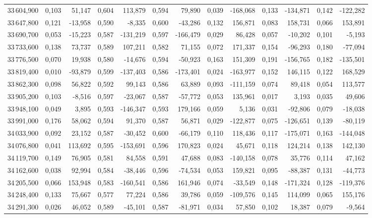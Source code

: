 \begin{longtable}{rrrrrrrrrrrrr}
33\,604,900 & 0,103 & 51,147 & 0,604 & 113,879 & 0,594 & 79,890 & 0,039 & -168,068 & 0,133 & -134,871 & 0,142 & -122,282\\
33\,647,800 & 0,121 & -13,958 & 0,590 & -8,335 & 0,600 & -43,286 & 0,132 & 156,871 & 0,083 & 158,731 & 0,066 & 153,891\\
33\,690,700 & 0,053 & -15,223 & 0,587 & -131,219 & 0,597 & -166,479 & 0,029 & 86,428 & 0,057 & -10,202 & 0,101 & -5,193\\
33\,733,600 & 0,138 & 73,737 & 0,589 & 107,211 & 0,582 & 71,155 & 0,072 & 171,337 & 0,154 & -96,293 & 0,180 & -77,094\\
33\,776,500 & 0,070 & 19,938 & 0,580 & -14,676 & 0,594 & -50,923 & 0,163 & 151,309 & 0,191 & -156,765 & 0,182 & -135,501\\
33\,819,400 & 0,010 & -93,879 & 0,599 & -137,403 & 0,586 & -173,401 & 0,024 & -163,977 & 0,152 & 146,115 & 0,122 & 168,529\\
33\,862,300 & 0,098 & 56,822 & 0,592 & 99,143 & 0,586 & 63,889 & 0,093 & -111,159 & 0,074 & 89,418 & 0,054 & 113,577\\
33\,905,200 & 0,103 & -8,516 & 0,597 & -23,067 & 0,587 & -57,772 & 0,053 & 135,961 & 0,017 & 3,193 & 0,035 & 49,606\\
33\,948,100 & 0,049 & 3,895 & 0,593 & -146,347 & 0,593 & 179,166 & 0,059 & 5,136 & 0,031 & -92,806 & 0,079 & -18,038\\
33\,991,000 & 0,176 & 58,062 & 0,594 & 91,370 & 0,587 & 56,871 & 0,029 & -122,877 & 0,075 & -126,651 & 0,139 & -80,119\\
34\,033,900 & 0,092 & 23,152 & 0,587 & -30,452 & 0,600 & -66,179 & 0,110 & 118,436 & 0,117 & -175,071 & 0,163 & -144,048\\
34\,076,800 & 0,041 & 113,692 & 0,595 & -153,691 & 0,596 & 170,823 & 0,024 & 45,671 & 0,118 & 124,214 & 0,138 & 142,130\\
34\,119,700 & 0,149 & 76,905 & 0,581 & 84,558 & 0,591 & 47,688 & 0,083 & -140,158 & 0,078 & 35,776 & 0,114 & 47,162\\
34\,162,600 & 0,038 & 92,994 & 0,584 & -38,446 & 0,596 & -74,534 & 0,053 & 159,821 & 0,095 & -88,387 & 0,131 & -44,773\\
34\,205,500 & 0,066 & 153,948 & 0,583 & -160,541 & 0,586 & 161,946 & 0,074 & -33,549 & 0,148 & -171,324 & 0,128 & -119,376\\
34\,248,400 & 0,133 & 75,667 & 0,577 & 77,224 & 0,586 & 39,786 & 0,059 & -109,576 & 0,145 & 114,099 & 0,065 & 155,176\\
34\,291,300 & 0,026 & 46,052 & 0,589 & -45,101 & 0,587 & -81,971 & 0,034 & 57,850 & 0,102 & 18,387 & 0,079 & -9,564\\

\end{longtable}
